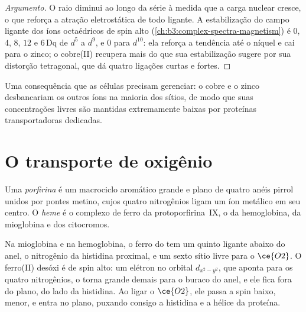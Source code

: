 \begin{proof}[Argumento]
O raio diminui ao longo da série à medida que a carga nuclear cresce, o que reforça
a atração eletrostática de todo ligante. A estabilização do campo ligante dos
íons octaédricos de spin alto (\cref{ch:b3:complex-spectra-magnetism}) é $0$, $4$,
$8$, $12$ e $6\,\mathrm{Dq}$ de $d^5$ a $d^9$, e $0$ para $d^{10}$: ela reforça a tendência até o níquel e
cai para o zinco; o cobre(II) recupera mais do que sua estabilização sugere por
sua distorção tetragonal, que dá quatro ligações curtas e fortes.
\end{proof}

Uma consequência que as células precisam gerenciar: o cobre e o zinco desbancariam os
outros íons na maioria dos sítios, de modo que suas concentrações livres são mantidas extremamente baixas
por proteínas transportadoras dedicadas.

\section{O transporte de oxigênio}

\begin{definition}\label{def:b3:bioinorganic:haem}
Uma \emph{porfirina} é um macrociclo aromático grande e plano de quatro
anéis pirrol unidos por pontes metino, cujos quatro nitrogênios ligam um íon metálico
em seu centro. O \emph{heme} é o complexo de ferro da protoporfirina~IX,
o  da hemoglobina, da mioglobina e dos citocromos.
\end{definition}

Na mioglobina e na hemoglobina, o ferro do  tem um quinto ligante abaixo do
anel, o nitrogênio da histidina proximal, e um sexto sítio livre para o $\ce{O2}$.
O ferro(II) desóxi é de spin alto: um elétron no orbital $d_{x^2-y^2}$, que aponta para os quatro
nitrogênios, o torna grande demais para o buraco do anel, e ele fica fora do
plano, do lado da histidina. Ao ligar o $\ce{O2}$, ele passa a spin baixo, menor, e
entra no plano, puxando consigo a histidina e a hélice da proteína.

